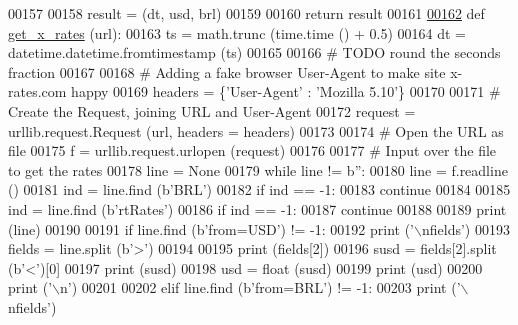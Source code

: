 \begin{DoxyCode}
00157     
00158     result = (dt, usd, brl)
00159     
00160     \textcolor{keywordflow}{return} result
00161         
\hypertarget{raw__urlparser_8py_source.tex_l00162}{}\hyperlink{namespaceraw__urlparser_ab9602b24afd1ae28d96beb085c37410e}{00162} \textcolor{keyword}{def }\hyperlink{namespaceraw__urlparser_ab9602b24afd1ae28d96beb085c37410e}{get\_x\_rates} (url):
00163     ts = math.trunc (time.time () + 0.5)
00164     dt = datetime.datetime.fromtimestamp (ts)
00165     
00166     \textcolor{comment}{# TODO round the seconds fraction}
00167     
00168     \textcolor{comment}{# Adding a fake browser User-Agent to make site x-rates.com happy}
00169     headers = \{\textcolor{stringliteral}{'User-Agent'} : \textcolor{stringliteral}{'Mozilla 5.10'}\}
00170         
00171     \textcolor{comment}{# Create the Request, joining URL and User-Agent}
00172     request = urllib.request.Request (url, headers = headers)
00173 
00174     \textcolor{comment}{# Open the URL as file}
00175     f = urllib.request.urlopen (request)
00176     
00177     \textcolor{comment}{# Input over the file to get the rates}
00178     line = \textcolor{keywordtype}{None}
00179     \textcolor{keywordflow}{while} line != b\textcolor{stringliteral}{''}:
00180         line = f.readline ()
00181         ind = line.find (b\textcolor{stringliteral}{'BRL'})
00182         \textcolor{keywordflow}{if} ind == -1:
00183             \textcolor{keywordflow}{continue} 
00184         
00185         ind = line.find (b\textcolor{stringliteral}{'rtRates'})
00186         \textcolor{keywordflow}{if} ind == -1:
00187             \textcolor{keywordflow}{continue} 
00188         
00189         \textcolor{keywordflow}{print} (line)
00190         
00191         \textcolor{keywordflow}{if} line.find (b\textcolor{stringliteral}{'from=USD'}) != -1:
00192             \textcolor{keywordflow}{print} (\textcolor{stringliteral}{'\(\backslash\)nfields'})
00193             fields = line.split (b\textcolor{stringliteral}{'>'})
00194             
00195             \textcolor{keywordflow}{print} (fields[2])
00196             susd = fields[2].split (b\textcolor{stringliteral}{'<'})[0]
00197             \textcolor{keywordflow}{print} (susd)
00198             usd = float (susd)
00199             \textcolor{keywordflow}{print} (usd)
00200             \textcolor{keywordflow}{print} (\textcolor{stringliteral}{'\(\backslash\)n'})
00201         
00202         \textcolor{keywordflow}{elif} line.find (b\textcolor{stringliteral}{'from=BRL'}) != -1:
00203             \textcolor{keywordflow}{print} (\textcolor{stringliteral}{'\(\backslash\)nfields'})

\end{DoxyCode}
